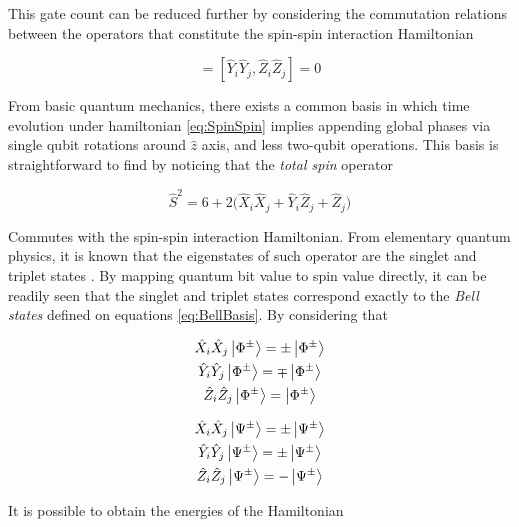     This gate count can be reduced further by considering the commutation relations between the operators that constitute the spin-spin interaction Hamiltonian

    \begin{equation}
      [\hat{X}_i\hat{X}_j, \hat{Z}_i\hat{Z}_j] = [\hat{Y}_i\hat{Y}_j, \hat{Z}_i\hat{Z}_j] = 0
      \label{eq:CommutationRelations}
    \end{equation}

    From basic quantum mechanics, there exists a common basis in which time evolution under hamiltonian \ref{eq:SpinSpin} implies appending global phases via single qubit rotations around $\hat{z}$ axis, and less two-qubit operations. This basis is straightforward to find by noticing that the \textit{total spin} operator

    \begin{equation}
      \hat{S}^2 = 6 + 2\Big(\hat{X}_i\hat{X}_j + \hat{Y}_i\hat{Z}_j + \hat{Z}_j\Big) 
      \label{eq:TotalSpin}
    \end{equation}

    Commutes with the spin-spin interaction Hamiltonian. From elementary quantum physics, it is known that the eigenstates of such operator are the singlet and triplet states \cite{Beck}. By mapping quantum bit value to spin value directly, it can be readily seen that the singlet and triplet states correspond exactly to the \textit{Bell states} defined on equations \ref{eq:BellBasis}. By considering that

    \begin{gather}
      \hat{X}_i\hat{X}_j \ket{\Phi^{\pm}} = \pm\ket{\Phi^{\pm}} \\
      \hat{Y}_i\hat{Y}_j \ket{\Phi^{\pm}} = \mp\ket{\Phi^{\pm}} \\
      \hat{Z}_i\hat{Z}_j \ket{\Phi^{\pm}} = \ket{\Phi^{\pm}}
      \label{eq:PhiBellBasisOps}
    \end{gather}

    \begin{gather}
      \hat{X}_i\hat{X}_j \ket{\Psi^{\pm}} = \pm\ket{\Psi^{\pm}} \\
      \hat{Y}_i\hat{Y}_j \ket{\Psi^{\pm}} = \pm\ket{\Psi^{\pm}} \\
      \hat{Z}_i\hat{Z}_j \ket{\Psi^{\pm}} = -\ket{\Psi^{\pm}}
      \label{eq:PsiBellBasisOps}
    \end{gather}

    It is possible to obtain the energies of the Hamiltonian

